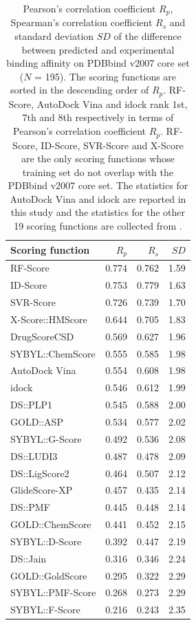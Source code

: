 \documentclass[journal=jacsat,manuscript=article]{achemso}
\begin{document}
\begin{table}
  \caption{Pearson's correlation coefficient $R_p$, Spearman's correlation coefficient $R_s$ and standard deviation $SD$ of the difference between predicted and experimental binding affinity on PDBbind v2007 core set ($N$ = 195). The scoring functions are sorted in the descending order of $R_p$. RF-Score, AutoDock Vina and idock rank 1st, 7th and 8th respectively in terms of Pearson's correlation coefficient $R_p$. RF-Score, ID-Score, SVR-Score and X-Score are the only scoring functions whose training set do not overlap with the PDBbind v2007 core set. The statistics for AutoDock Vina and idock are reported in this study and the statistics for the other 19 scoring functions are collected from \cite{1313,564,1305,1295}.}
  \label{tbl:example}
  \begin{tabular}{lrrr}
    \hline
Scoring function & $R_p$ & $R_s$ & $SD$\\
\hline
RF-Score & 0.774 & 0.762 & 1.59\\
ID-Score & 0.753 & 0.779 & 1.63\\
SVR-Score & 0.726 & 0.739 & 1.70\\
X-Score::HMScore & 0.644 & 0.705 & 1.83\\
DrugScoreCSD & 0.569 & 0.627 & 1.96\\
SYBYL::ChemScore & 0.555 & 0.585 & 1.98\\
AutoDock Vina & 0.554 & 0.608 & 1.98\\
idock & 0.546 & 0.612 & 1.99\\
DS::PLP1 & 0.545 & 0.588 & 2.00\\
GOLD::ASP & 0.534 & 0.577 & 2.02\\
SYBYL::G-Score & 0.492 & 0.536 & 2.08\\
DS::LUDI3 & 0.487 & 0.478 & 2.09\\
DS::LigScore2 & 0.464 & 0.507 & 2.12\\
GlideScore-XP & 0.457 & 0.435 & 2.14\\
DS::PMF & 0.445 & 0.448 & 2.14\\
GOLD::ChemScore & 0.441 & 0.452 & 2.15\\
SYBYL::D-Score & 0.392 & 0.447 & 2.19\\
DS::Jain & 0.316 & 0.346 & 2.24\\
GOLD::GoldScore & 0.295 & 0.322 & 2.29\\
SYBYL::PMF-Score & 0.268 & 0.273 & 2.29\\
SYBYL::F-Score & 0.216 & 0.243 & 2.35\\
    \hline
  \end{tabular}
\end{table}
\end{document}
